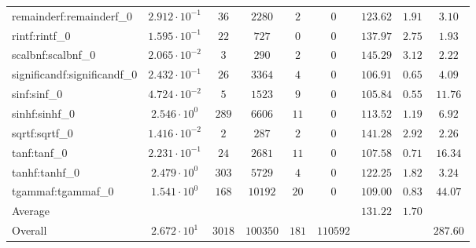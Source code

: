\begin{tabular}{|l|c|c|c|c|c|c|c|c|}
remainderf:remainderf\_0     & $ 2.912 \cdot 10^{-1} $ & $ 36     $ & $ 2280   $ & $ 2   $ & $ 0      $ & $ 123.62      $ & $ 1.91    $ & $ 3.10    $ \\
rintf:rintf\_0               & $ 1.595 \cdot 10^{-1} $ & $ 22     $ & $ 727    $ & $ 0   $ & $ 0      $ & $ 137.97      $ & $ 2.75    $ & $ 1.93    $ \\
scalbnf:scalbnf\_0           & $ 2.065 \cdot 10^{-2} $ & $ 3      $ & $ 290    $ & $ 2   $ & $ 0      $ & $ 145.29      $ & $ 3.12    $ & $ 2.22    $ \\
significandf:significandf\_0 & $ 2.432 \cdot 10^{-1} $ & $ 26     $ & $ 3364   $ & $ 4   $ & $ 0      $ & $ 106.91      $ & $ 0.65    $ & $ 4.09    $ \\
sinf:sinf\_0                 & $ 4.724 \cdot 10^{-2} $ & $ 5      $ & $ 1523   $ & $ 9   $ & $ 0      $ & $ 105.84      $ & $ 0.55    $ & $ 11.76   $ \\
sinhf:sinhf\_0               & $ 2.546 \cdot 10^{0}  $ & $ 289    $ & $ 6606   $ & $ 11  $ & $ 0      $ & $ 113.52      $ & $ 1.19    $ & $ 6.92    $ \\
sqrtf:sqrtf\_0               & $ 1.416 \cdot 10^{-2} $ & $ 2      $ & $ 287    $ & $ 2   $ & $ 0      $ & $ 141.28      $ & $ 2.92    $ & $ 2.26    $ \\
tanf:tanf\_0                 & $ 2.231 \cdot 10^{-1} $ & $ 24     $ & $ 2681   $ & $ 11  $ & $ 0      $ & $ 107.58      $ & $ 0.71    $ & $ 16.34   $ \\
tanhf:tanhf\_0               & $ 2.479 \cdot 10^{0}  $ & $ 303    $ & $ 5729   $ & $ 4   $ & $ 0      $ & $ 122.25      $ & $ 1.82    $ & $ 3.24    $ \\
tgammaf:tgammaf\_0           & $ 1.541 \cdot 10^{0}  $ & $ 168    $ & $ 10192  $ & $ 20  $ & $ 0      $ & $ 109.00      $ & $ 0.83    $ & $ 44.07   $ \\
\hline
Average                      & $                     $ & $        $ & $        $ & $     $ & $        $ & $ 131.22      $ & $ 1.70    $ & $         $ \\
\hline
Overall                      & $ 2.672 \cdot 10^{1}  $ & $ 3018   $ & $ 100350 $ & $ 181 $ & $ 110592 $ & $             $ & $         $ & $ 287.60  $ \\
\hline
\end{tabular}
